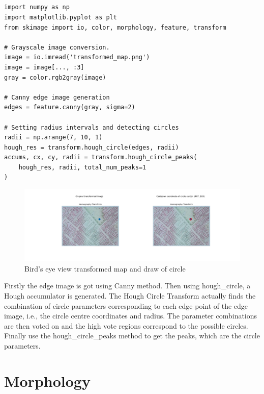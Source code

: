 \documentclass[12pt]{article}
\begin{document}
\newpage
\subsection{}
\begin{lstlisting}
import numpy as np
import matplotlib.pyplot as plt
from skimage import io, color, morphology, feature, transform

# Grayscale image conversion.
image = io.imread('transformed_map.png')
image = image[..., :3]
gray = color.rgb2gray(image)

# Canny edge image generation
edges = feature.canny(gray, sigma=2)

# Setting radius intervals and detecting circles
radii = np.arange(7, 10, 1) 
hough_res = transform.hough_circle(edges, radii)
accums, cx, cy, radii = transform.hough_circle_peaks(
    hough_res, radii, total_num_peaks=1
)

\end{lstlisting}
\begin{figure}[ht]
    \centering
    \includegraphics[width=1\textwidth]{pics/A7_3.4.png} 
    \caption{Bird’s eye view transformed map and draw of circle}
    \label{fig: Figure 9}
\end{figure}
Firstly the edge image is got using Canny method. Then using hough\_circle, a Hough accumulator is generated.
The Hough Circle Transform actually finds the combination of circle parameters corresponding to each edge point of the edge image, i.e., the circle centre coordinates and radius. The parameter combinations are then voted on and the high vote regions correspond to the possible circles.
Finally use the hough\_circle\_peaks method to get the peaks, which are the circle parameters.
\section{Morphology}
\subsection{} %
\end{document}
